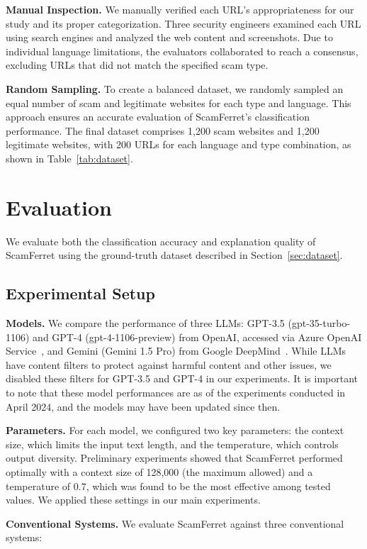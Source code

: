 \documentclass[runningheads]{llncs}
\begin{document}
\noindent\textbf{Manual Inspection.}
We manually verified each URL's appropriateness for our study and its proper categorization.
Three security engineers examined each URL using search engines and analyzed the web content and screenshots.
Due to individual language limitations, the evaluators collaborated to reach a consensus, excluding URLs that did not match the specified scam type.

\noindent\textbf{Random Sampling.}
To create a balanced dataset, we randomly sampled an equal number of scam and legitimate websites for each type and language.
This approach ensures an accurate evaluation of ScamFerret's classification performance.
The final dataset comprises 1,200 scam websites and 1,200 legitimate websites, with 200 URLs for each language and type combination, as shown in Table~\ref{tab:dataset}.


\section{Evaluation}
\label{sec:evaluation}
We evaluate both the classification accuracy and explanation quality of ScamFerret using the ground-truth dataset described in Section~\ref{sec:dataset}.

\subsection{Experimental Setup}
\noindent\textbf{Models.}
We compare the performance of three LLMs: GPT-3.5 (gpt-35-turbo-1106) and GPT-4 (gpt-4-1106-preview) from OpenAI, accessed via Azure OpenAI Service~\cite{azure_openai}, and Gemini (Gemini 1.5 Pro) from Google DeepMind~\cite{gemini}.
While LLMs have content filters to protect against harmful content and other issues, we disabled these filters for GPT-3.5 and GPT-4 in our experiments.
It is important to note that these model performances are as of the experiments conducted in April 2024, and the models may have been updated since then.

\noindent\textbf{Parameters.}
For each model, we configured two key parameters: the context size, which limits the input text length, and the temperature, which controls output diversity.
Preliminary experiments showed that ScamFerret performed optimally with a context size of 128,000 (the maximum allowed) and a temperature of 0.7, which was found to be the most effective among tested values.
We applied these settings in our main experiments.

\noindent\textbf{Conventional Systems.}
We evaluate ScamFerret against three conventional systems:
\end{document}
